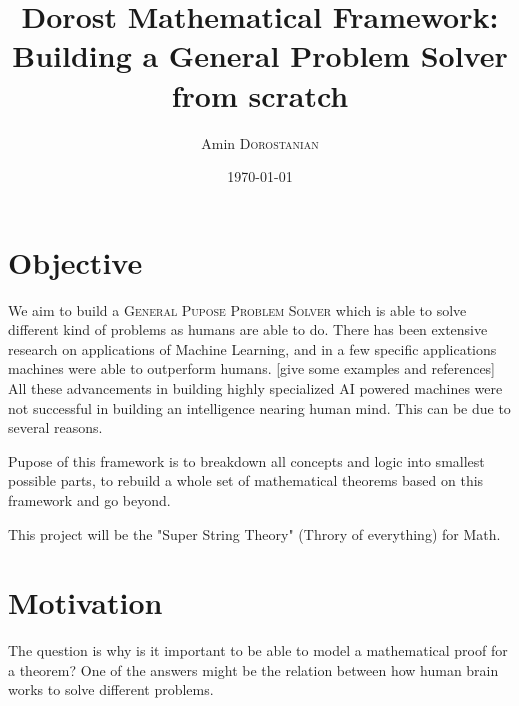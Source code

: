 \documentclass{article}
\title{Dorost Mathematical Framework: Building a General Problem Solver from scratch} %
\author{Amin \textsc{Dorostanian}} %
\date{\today} %
\begin{document}
\maketitle %




\section{Objective}

We aim to build a \textsc{General Pupose Problem Solver} which is able to solve different kind of problems as humans
are able to do. There has been extensive research on applications of Machine Learning, and in a few specific applications machines were able to outperform humans. [give some examples and references]\\

All these advancements in building highly specialized AI powered machines were not successful in building an intelligence nearing human mind. This can be due to several reasons.


Pupose of this framework is to breakdown all concepts and logic into smallest possible parts, to rebuild a whole set of mathematical theorems based on this framework and go beyond.


This project will be the "Super String Theory" (Throry of everything) for Math.


\section{Motivation}
The question is why is it important to be able to model a mathematical proof for a theorem?
One of the answers might be the relation between how human brain works to solve different problems.
\end{document}

